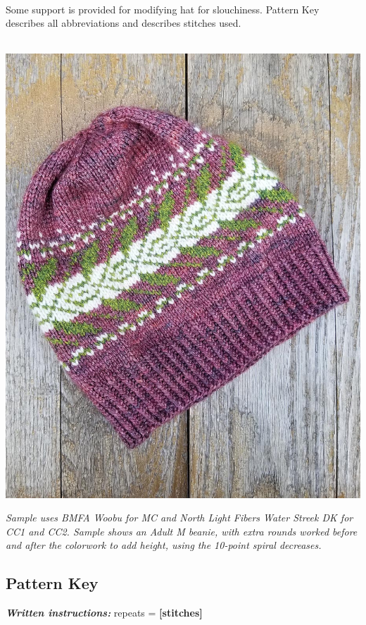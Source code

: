 \documentclass[12pt]{article}
\newcommand{\vocab}[1]{\emph{\textbf{#1}}} %
\renewcommand{\repeat}[1]{\textbf{[#1]}} %
\begin{document}
\begin{multicols}{2}
~\\
Some support is provided for modifying hat for slouchiness.
Pattern Key describes all abbreviations and describes stitches used.

~\\
\vfill \raggedleft
\includegraphics[width=0.7\linewidth]{laidFlat.jpg}

\begin{addmargin}[0.3\linewidth]{0em}
\raggedleft\emph{\ssmall Sample uses BMFA Woobu for MC and North Light Fibers Water Streek DK for CC1 and CC2. Sample shows an Adult M beanie, with extra rounds worked before and after the colorwork to add height, using the 10-point spiral decreases.}
\end{addmargin}

\newpage \raggedright
\subsection*{Pattern Key}

\vocab{Written instructions:} repeats = \repeat{stitches}


\end{multicols}
\end{document}
